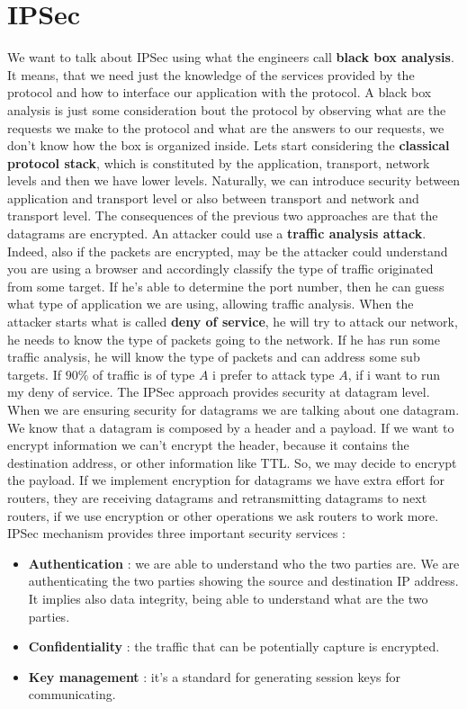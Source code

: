 \documentclass[11pt]{article}
\begin{document}
\section{IPSec}
We want to talk about IPSec using what the engineers call \textbf{black box analysis}. It means, that we need just the knowledge of the services provided by the protocol and how to interface our application with the protocol. A black box analysis is just some consideration bout the protocol by observing what are the requests we make to the protocol and what are the answers to our requests, we don't know how the box is organized inside. Lets start considering the \textbf{classical protocol stack}, which is constituted by the application, transport, network levels and then we have lower levels. Naturally, we can introduce security between application and transport level or also between transport and network and transport level. The consequences of the previous two approaches are that the datagrams are encrypted. An attacker could use a \textbf{traffic analysis attack}. Indeed, also if the packets are encrypted, may be the attacker could understand you are using a browser and accordingly classify the type of traffic originated from some target. If he's able to determine the port number, then he can guess what type of application we are using, allowing traffic analysis. When the attacker starts what is called \textbf{deny of service}, he will try to attack our network, he needs to know the type of packets going to the network. If he has run some traffic analysis, he will know the type of packets and can address some sub targets. If $90\%$ of traffic is of type $A$ i prefer to attack type $A$, if i want to run my deny of service. The IPSec approach provides security at datagram level. When we are ensuring security for datagrams we are talking about one datagram. We know that a datagram is composed by a header and a payload. If we want to encrypt information we can't encrypt the header, because it contains the destination address, or other information like TTL. So, we may decide to encrypt the payload. If we implement encryption for datagrams we have extra effort for routers, they are receiving datagrams and retransmitting datagrams to next routers, if we use encryption or other operations we ask routers to work more. IPSec mechanism provides three important security services :
\begin{itemize}
\item \textbf{Authentication} : we are able to understand who the two parties are. We are authenticating the two parties showing the source and destination IP address. It implies also data integrity, being able to understand what are the two parties. 
\item \textbf{Confidentiality} : the traffic that can be potentially capture is encrypted.
\item \textbf{Key management} : it's a standard for generating session keys for communicating.
\end{itemize}
\end{document}
